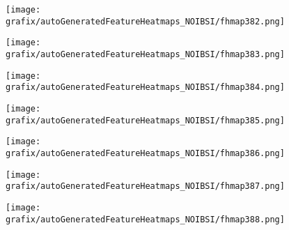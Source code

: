 \begin{subfigure}{\wid\textwidth} 
    \centering 
    \caption{\tiny \sffamily {}} 
    \vspace{\vsp} 
    \texttt{[image: grafix/autoGeneratedFeatureHeatmaps\_NOIBSI/fhmap382.png]} 
\end{subfigure} 
\hspace{\hsp} 
\begin{subfigure}{\wid\textwidth} 
    \centering 
    \caption{\tiny \sffamily {}} 
    \vspace{\vsp} 
    \texttt{[image: grafix/autoGeneratedFeatureHeatmaps\_NOIBSI/fhmap383.png]} 
\end{subfigure} 
\hspace{\hsp} 
\begin{subfigure}{\wid\textwidth} 
    \centering 
    \caption{\tiny \sffamily {}} 
    \vspace{\vsp} 
    \texttt{[image: grafix/autoGeneratedFeatureHeatmaps\_NOIBSI/fhmap384.png]} 
\end{subfigure} 
\hspace{\hsp} 
\begin{subfigure}{\wid\textwidth} 
    \centering 
    \caption{\tiny \sffamily {}} 
    \vspace{\vsp} 
    \texttt{[image: grafix/autoGeneratedFeatureHeatmaps\_NOIBSI/fhmap385.png]} 
\end{subfigure} 
\hspace{\hsp} 
\begin{subfigure}{\wid\textwidth} 
    \centering 
    \caption{\tiny \sffamily {}} 
    \vspace{\vsp} 
    \texttt{[image: grafix/autoGeneratedFeatureHeatmaps\_NOIBSI/fhmap386.png]} 
\end{subfigure} 
\hspace{\hsp} 
\begin{subfigure}{\wid\textwidth} 
    \centering 
    \caption{\tiny \sffamily {}} 
    \vspace{\vsp} 
    \texttt{[image: grafix/autoGeneratedFeatureHeatmaps\_NOIBSI/fhmap387.png]} 
\end{subfigure} 
\hspace{\hsp} 
\begin{subfigure}{\wid\textwidth} 
    \centering 
    \caption{\tiny \sffamily {}} 
    \vspace{\vsp} 
    \texttt{[image: grafix/autoGeneratedFeatureHeatmaps\_NOIBSI/fhmap388.png]} 
\end{subfigure} 
